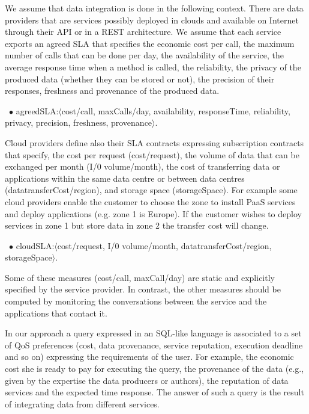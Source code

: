 
We assume that data integration is done in the following context. There are data providers that are services possibly deployed in clouds and available on Internet through their API or in a REST architecture. We assume that  each service exports an agreed SLA that specifies the economic cost per call, the maximum number of calls that can be done per day, the availability of the service, the average response time when a method is called, the reliability, the privacy of the produced data (whether they can be stored or not), the precision of their responses, freshness and provenance of the produced data.  

\begin{trivlist}\sf\footnotesize
\item[~$\bullet$ ] {\sf agreedSLA:$\langle$cost/call, maxCalls/day, availability, responseTime, reliability, privacy, precision, freshness, provenance$\rangle$}. 
 \end{trivlist}

Cloud providers define also their SLA contracts expressing  subscription contracts that specify, the cost per request ({\sf cost/request}), the volume of data that can be exchanged per month ({\sf I/0 volume/month}), the cost of transferring data or applications within the same data centre or between data centres ({\sf datatransferCost/region}), and storage space ({\sf storageSpace}). For example some cloud providers enable the customer to choose the zone to install PaaS services and deploy applications (e.g. zone 1 is Europe). If the customer wishes to deploy services in zone 1 but store data in zone 2 the transfer cost will change.

\begin{trivlist}\sf\footnotesize
 \item[~$\bullet$ ]  {\sf cloudSLA:$\langle$cost/request, I/0 volume/month, datatransferCost/region, storageSpace$\rangle$}. 
 \end{trivlist}


Some of these measures ({\sf cost/call, maxCall/day}) are static and explicitly specified by the service provider. 
In contrast, the other measures should be computed by monitoring the conversations between the service and the applications that contact it.  

In our approach a query expressed in an SQL-like language is associated to a set of QoS preferences (cost, data provenance, service reputation, execution deadline and so on) expressing the requirements of the user. For example, the economic cost she is ready to pay for executing the query, the provenance of the data (e.g., given by the expertise the data producers or authors), the reputation of data services and the expected time response. The answer of such a query is the result of integrating data from different services.

